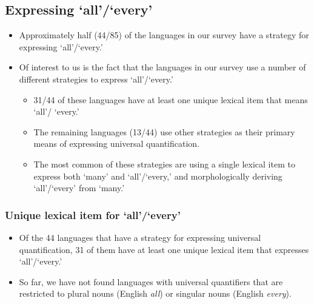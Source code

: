 \documentclass{article}
\makeatletter
\newcommand{\ofy}{/85} %
\makeatother
\begin{document}

\subsection{Expressing `all'/`every'}

\begin{itemize}
\item Approximately half (44\ofy) of the languages in our survey have a strategy for expressing `all'/`every.'
\item Of interest to us is the fact that the languages in our survey use a number of different strategies to express `all'/`every.'
  \begin{itemize}
  \item 31/44 of these languages have at least one unique lexical item that means `all'/ `every.'
  \item The remaining languages (13/44) use other strategies as their primary means of expressing universal quantification.
    
  \item The most common of these strategies are using a single lexical item to express both `many' and `all'/`every,' and morphologically deriving `all'/`every' from `many.'
  \end{itemize}
\end{itemize}

\subsubsection{Unique lexical item for `all'/`every'}

\begin{itemize}
\item  Of the 44 languages that have a strategy for expressing universal quantification, 31 of them have at least one unique lexical item that expresses `all'/`every.'
\item So far, we have not found languages  with universal quantifiers that are restricted to plural nouns (English {\it all}) or singular nouns (English {\it every}).
\end{itemize}
\end{document}
